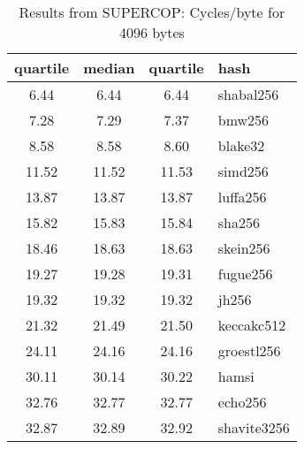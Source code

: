 \begin{table}
  \centering
  \begin{tabular}{ | c | c | c | l | }
    \hline
    \textbf{quartile} & \textbf{median} & \textbf{quartile} & \textbf{hash} \\ \hline
    6.44 & 6.44 & 6.44 & shabal256 \\ \hline
    7.28 & 7.29 & 7.37 & bmw256 \\ \hline
    8.58 & 8.58 & 8.60 & blake32 \\ \hline
    11.52 & 11.52 & 11.53 & simd256 \\ \hline
    13.87 & 13.87 & 13.87 & luffa256 \\ \hline
    15.82 & 15.83 & 15.84 & sha256 \\ \hline
    18.46 & 18.63 & 18.63 & skein256 \\ \hline
    19.27 & 19.28 & 19.31 & fugue256 \\ \hline
    19.32 & 19.32 & 19.32 & jh256 \\ \hline
    21.32 & 21.49 & 21.50 & keccakc512 \\ \hline
    24.11 & 24.16 & 24.16 & groestl256 \\ \hline
    30.11 & 30.14 & 30.22 & hamsi \\ \hline
    32.76 & 32.77 & 32.77 & echo256 \\ \hline
    32.87 & 32.89 & 32.92 & shavite3256 \\ \hline
  \end{tabular}
  \caption{Results from SUPERCOP: Cycles/byte for 4096 bytes}
  \label{tbl:supercop:4096}
\end{table}
